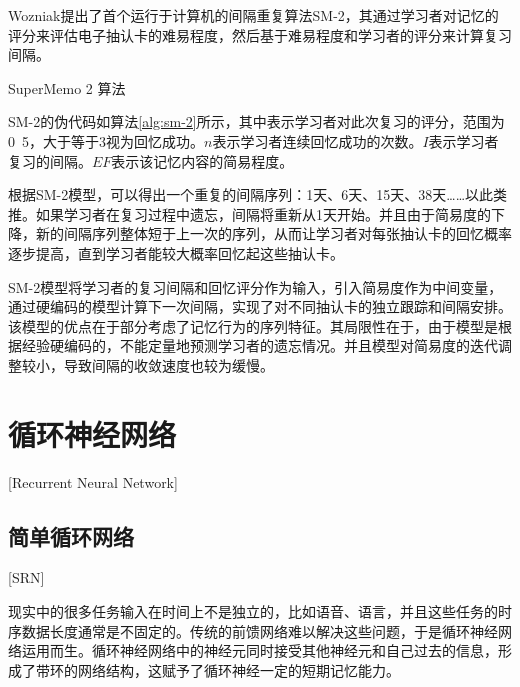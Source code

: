 Wozniak提出了首个运行于计算机的间隔重复算法SM-2\cite{wozniakOptimizationLearning1990}，其通过学习者对记忆的评分来评估电子抽认卡的难易程度，然后基于难易程度和学习者的评分来计算复习间隔。

\begin{algorithm}[htbp]
\caption{SuperMemo 2 算法}
\label{alg:sm-2}
\end{algorithm}

SM-2的伪代码如算法\ref{alg:sm-2}所示，其中表示学习者对此次复习的评分，范围为0~5，大于等于3视为回忆成功。$n$表示学习者连续回忆成功的次数。$I$表示学习者复习的间隔。$EF$表示该记忆内容的简易程度。

根据SM-2模型，可以得出一个重复的间隔序列：1天、6天、15天、38天……以此类推。如果学习者在复习过程中遗忘，间隔将重新从1天开始。并且由于简易度的下降，新的间隔序列整体短于上一次的序列，从而让学习者对每张抽认卡的回忆概率逐步提高，直到学习者能较大概率回忆起这些抽认卡。

SM-2模型将学习者的复习间隔和回忆评分作为输入，引入简易度作为中间变量，通过硬编码的模型计算下一次间隔，实现了对不同抽认卡的独立跟踪和间隔安排。该模型的优点在于部分考虑了记忆行为的序列特征。其局限性在于，由于模型是根据经验硬编码的，不能定量地预测学习者的遗忘情况。并且模型对简易度的迭代调整较小，导致间隔的收敛速度也较为缓慢。

\section{循环神经网络}[Recurrent Neural Network]

\subsection{简单循环网络}[SRN]

现实中的很多任务输入在时间上不是独立的，比如语音、语言，并且这些任务的时序数据长度通常是不固定的。传统的前馈网络难以解决这些问题，于是循环神经网络运用而生。循环神经网络中的神经元同时接受其他神经元和自己过去的信息，形成了带环的网络结构，这赋予了循环神经一定的短期记忆能力。

